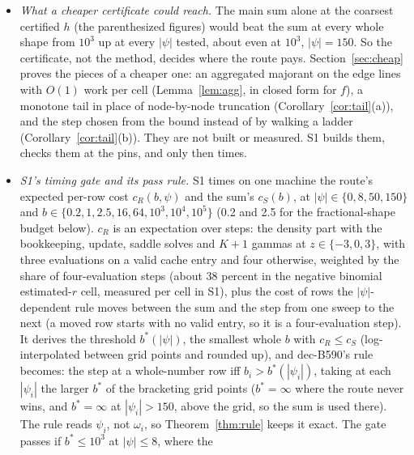 \begin{enumerate}
\begin{itemize}
400); at $|\psi|=50$ it loses up to $b=10^3$ and wins at $10^4$ and $10^5$; at $|\psi|=150$ it loses at every shape
tested, $10^3$ to $10^5$ (1.7 against 0.14\,ms at $10^3$, 24 against 14\,ms at $10^5$). The radius bookkeeping and
the gammas only add to the route. The first referee's reading is right: at large $|\psi|$ the $K+1$ terms per $q$
node decide it. At fractional shapes, where there is no sum, a row step costs 43 to 90\,$\mu$s at $|\psi|\le50$ and
about 320 at $|\psi|=150$, against the design's 7.0.
\item \emph{What a cheaper certificate could reach.} The main sum alone at the coarsest certified $h$ (the
parenthesized figures) would beat the sum at every whole shape from $10^3$ up at every $|\psi|$ tested, about even at
$10^3$, $|\psi|=150$. So the certificate, not the method, decides where the route pays. Section~\ref{sec:cheap}
proves the pieces of a cheaper one: an aggregated majorant on the edge lines with $O(1)$ work per cell
(Lemma~\ref{lem:agg}, in closed form for $f$), a monotone tail in place of node-by-node truncation
(Corollary~\ref{cor:tail}(a)), and the step chosen from the bound instead of by walking a ladder
(Corollary~\ref{cor:tail}(b)). They are not built or measured. S1 builds them, checks them at the pins, and only then
times.
\item \emph{S1's timing gate and its pass rule.} S1 times on one machine the route's expected per-row cost
$c_R(b,\psi)$ and the sum's $c_S(b)$, at $|\psi|\in\{0,8,50,150\}$ and $b\in\{0.2,1,2.5,16,64,10^3,10^4,10^5\}$
(0.2 and 2.5 for the fractional-shape budget below). $c_R$ is an expectation over steps: the density part with the
bookkeeping, update, saddle solves and $K+1$ gammas at $z\in\{-3,0,3\}$, with three evaluations on a valid cache
entry and four otherwise, weighted by the share of four-evaluation steps (about 38 percent in the negative binomial
estimated-$r$ cell, measured per cell in S1), plus the cost of rows the $|\psi|$-dependent rule moves between the sum
and the step from one sweep to the next (a moved row starts with no valid entry, so it is a four-evaluation step).
It derives the threshold
$b^*(|\psi|)$, the smallest whole $b$ with $c_R\le c_S$ (log-interpolated between grid points and rounded up), and
dec-B590's rule becomes: the step at a whole-number row iff $b_i>b^*(|\psi_i|)$, taking at each $|\psi_i|$ the larger
$b^*$ of the bracketing grid points ($b^*=\infty$ where the route never wins, and $b^*=\infty$ at
$|\psi_i|>150$, above the grid, so the sum is used there). The rule reads $\psi_i$, not
$\omega_i$, so Theorem~\ref{thm:rule} keeps it exact. The gate passes if $b^*\le10^3$ at $|\psi|\le8$, where the

\end{itemize}
\end{enumerate}
